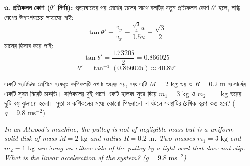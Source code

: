 \documentclass[12pt, a4paper]{article}
\begin{document}
\begin{tcolorbox}[solutionbox={সমাধান (Solution)}]
\vspace{0.5em}
\textbf{৩. প্রতিফলন কোণ ($\theta'$ নির্ণয়):}
প্রত্যাঘাতের পর মেঝের তলের সাথে বলটির নতুন প্রতিফলন কোণ $\theta'$ হলে, লব্ধি বেগের উপাংশদ্বয়ের সাহায্যে পাই:
$$\tan\theta' = \frac{v_y}{v_x} = \frac{\frac{\sqrt{3}}{4} u}{0.5 u} = \frac{\sqrt{3}}{2}$$
মানের হিসাব করে পাই:
$$\tan\theta' = \frac{1.73205}{2} = 0.866025$$
$$\theta' = \tan^{-1}(0.866025) \approx 40.89^\circ$$
\end{tcolorbox}
\vspace{1em}
\begin{tcolorbox}[questionbox={প্রশ্ন (Question) 22}]
\noindent
একটি অ্যাটউড মেশিনে ব্যবহৃত কপিকলটি নগণ্য ভরের নয়, বরং এটি $M = 2\text{ kg}$ ভর ও $R = 0.2\text{ m}$ ব্যাসার্ধের একটি সুষম নিরেট চাকতি। কপিকলের দুই পাশে একটি হালকা সুতা দিয়ে $m_1 = 3\text{ kg}$ ও $m_2 = 1\text{ kg}$ ভরের দুটি বস্তু ঝুলানো হলো। সুতা ও কপিকলের মধ্যে কোনো পিছলানো না ঘটলে সংস্থাটির রৈখিক ত্বরণ কত হবে? ($g = 9.8\text{ ms}^{-2}$)

\vspace{0.8em}
\begin{english}
\noindent\textit{\color{darkgray}
In an Atwood's machine, the pulley is not of negligible mass but is a uniform solid disk of mass $M = 2\text{ kg}$ and radius $R = 0.2\text{ m}$. Two masses $m_1 = 3\text{ kg}$ and $m_2 = 1\text{ kg}$ are hung on either side of the pulley by a light cord that does not slip. What is the linear acceleration of the system? ($g = 9.8\text{ ms}^{-2}$)
}
\end{english}
\end{tcolorbox}
\end{document}
